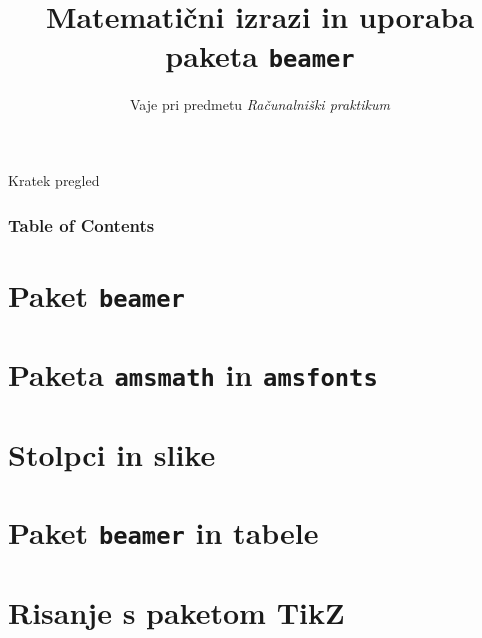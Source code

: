 \documentclass{beamer}
\begin{document}
\title{Matematični izrazi in uporaba paketa \texttt{beamer}}
\subtitle{Vaje pri predmetu \emph{Računalniški praktikum}}
\date{}

\begin{frame}
    \titlepage
\end{frame}



\begin{frame}{Kratek pregled}
\frametitle{Table of Contents}
\tableofcontents%
\end{frame}

\section{Paket \texttt{beamer}}


\section{Paketa \texttt{amsmath} in \texttt{amsfonts}}


\section{Stolpci in slike}


\section{Paket \texttt{beamer} in tabele}


\section{Risanje s paketom TikZ}

\end{document}
